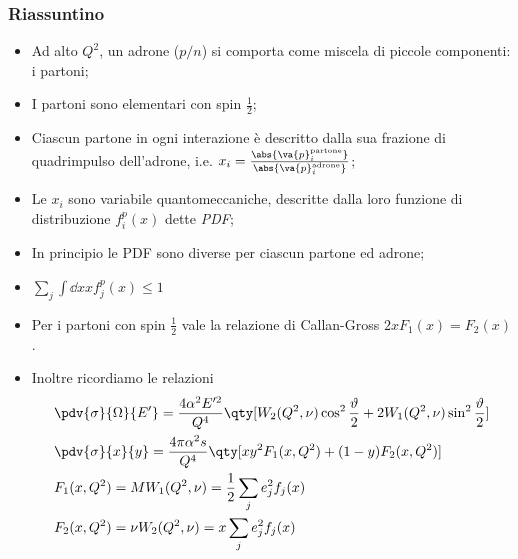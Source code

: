 \subsubsection{Riassuntino}
\begin{itemize}
    \item Ad alto $Q^2$, un adrone ($p/n$) si comporta come miscela di piccole componenti: i partoni;
    \item I partoni sono elementari con spin $\frac{1}{2}$;
    \item Ciascun partone in ogni interazione è descritto dalla sua frazione di quadrimpulso dell'adrone, i.e. $x_i=\frac{\abs{\va{p}_i^{\textnormal{partone}}}}{\abs{\va{p}_i^{\textnormal{adrone}}}}$;
    \item Le $x_i$ sono variabile quantomeccaniche, descritte dalla loro funzione di distribuzione $f_i^p(x)$ dette \textit{PDF};
    \item In principio le PDF sono diverse per ciascun partone ed adrone;
    \item $\sum_j \int\dd{x}xf_j^p(x)\leq1$
    \item Per i partoni con spin $\frac{1}{2}$ vale la relazione di Callan-Gross $2xF_1(x)=F_2(x)$.
    \item Inoltre ricordiamo le relazioni
    \begin{align*}
    &\pdv{\sigma}{\Omega}{E'}=\frac{4\alpha^2E'^2}{Q^4}\qty[W_2(Q^2,\nu)\cos^2\frac{\vartheta}{2}+2W_1(Q^2,\nu)\sin^2\frac{\vartheta}{2}]\\
    &\pdv{\sigma}{x}{y}=\frac{4\pi \alpha^2s}{Q^4}\qty[xy^2F_1(x,Q^2)+(1-y)F_2(x,Q^2)]\\
    &F_1(x,Q^2)=MW_1(Q^2,\nu)=\frac{1}{2}\sum_je^2_jf_j(x)\\
    &F_2(x,Q^2)=\nu W_2(Q^2,\nu)=x\sum_je^2_jf_j(x)
    \end{align*}
\end{itemize}
